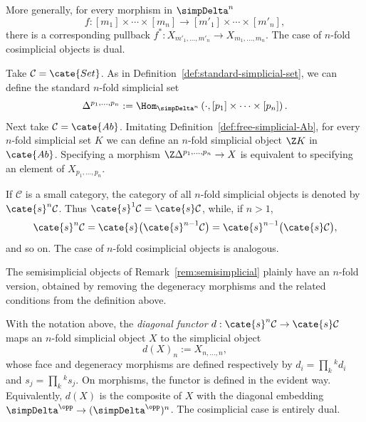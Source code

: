 More generally, for every morphism in $\simpDelta^n$
\[ f:[m_1]\times\cdots\times[m_n]\to[m'_1]\times\cdots\times[m'_n], \]
there is a corresponding pullback
$f^*:X_{m'_1,\ldots,m'_n}\to X_{m_1,\ldots,m_n}$. The case of $n$-fold
cosimplicial objects is dual.

\begin{example}\label{eg:standard-n-fold-sSet}
	Take $\mathcal{C}=\cate{Set}$. As in
	Definition~\ref{def:standard-simplicial-set}, we can define the standard
	$n$-fold simplicial set
	\[ \Delta^{p_1, \ldots, p_n} := \Hom_{\simpDelta^n}\left(\cdot, [p_1] \times \cdots \times [p_n] \right). \]
	Next take $\mathcal{C}=\cate{Ab}$. Imitating
	Definition~\ref{def:free-simplicial-Ab}, for every $n$-fold simplicial set
	$K$ we can define an $n$-fold simplicial object $\Z K$ in $\cate{Ab}$.
	Specifying a morphism $\Z\Delta^{p_1,\ldots,p_n}\to X$ is equivalent to
	specifying an element of $X_{p_1,\ldots,p_n}$.
\end{example}

If $\mathcal{C}$ is a small category, the category of all $n$-fold
simplicial objects is denoted by $\cate{s}^n\mathcal{C}$. Thus
$\cate{s}^1\mathcal{C}=\cate{s}\mathcal{C}$, while, if $n>1$,
\[ \cate{s}^n\mathcal{C}=\cate{s}\bigl(\cate{s}^{n-1}\mathcal{C}\bigr)
=\cate{s}^{n-1}\bigl(\cate{s}\mathcal{C}\bigr), \]
and so on. The case of $n$-fold cosimplicial objects is analogous.

The semisimplicial objects of Remark~\ref{rem:semisimplicial} plainly have
an $n$-fold version, obtained by removing the degeneracy morphisms and the
related conditions from the definition above.

\begin{definition}\label{def:bisimplicial-diagonal}
	With the notation above, the \emph{diagonal functor}
	$d:\cate{s}^n\mathcal{C}\to\cate{s}\mathcal{C}$ maps an $n$-fold
	simplicial object $X$ to the simplicial object
	\[ d(X)_n := X_{n, \ldots, n}, \]
	whose face and degeneracy morphisms are defined respectively by
	$d_i=\prod_k{}^kd_i$ and $s_j=\prod_k{}^ks_j$. On morphisms, the functor
	is defined in the evident way. Equivalently, $d(X)$ is the composite of
	$X$ with the diagonal embedding
	$\simpDelta^{\opp}\to(\simpDelta^{\opp})^n$. The cosimplicial case is
	entirely dual.
\end{definition}


